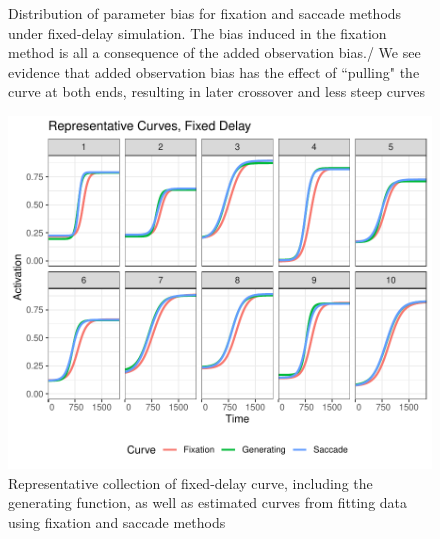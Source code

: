 \documentclass{article}
\begin{document}
\begin{figure}[H]
    \centering
    \caption{Distribution of parameter bias for fixation and saccade methods under fixed-delay simulation. The bias induced in the fixation method is all a consequence of the added observation bias./ We see evidence that added observation bias has the effect of ``pulling" the curve at both ends, resulting in later crossover and less steep curves}
\label{fig:fixed_par_bias}
\end{figure}




\begin{figure}[H]
\centering
\includegraphics{fixed_pb_curves.pdf}
\caption{Representative collection of fixed-delay curve, including  the generating function, as well as estimated curves from fitting data using fixation and saccade methods}
\label{fig:fixed_pb_curves}
\end{figure}
\end{document}
